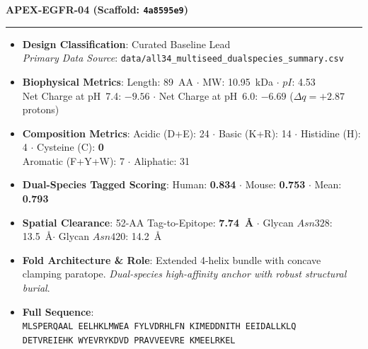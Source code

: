 \documentclass[11pt]{article}
\begin{document}
\noindent\textbf{\color{navyblue}\large APEX-EGFR-04  \quad (Scaffold: \texttt{4a8595e9})} \\
\vspace{-0.4em}
\rule{\textwidth}{0.6pt}
\vspace{-0.2em}
\begin{itemize}
  \setlength{\itemsep}{2pt}
  \setlength{\parskip}{0pt}
  \item \textbf{Design Classification}: Curated Baseline Lead \\
    \textit{Primary Data Source}: \texttt{\small data/all34\_multiseed\_dualspecies\_summary.csv}
  \item \textbf{Biophysical Metrics}: Length: 89~AA $\cdot$ MW: 10.95~kDa $\cdot$ $pI$: 4.53 \\
    Net Charge at pH~7.4: $-9.56$ $\cdot$ Net Charge at pH~6.0: $-6.69$ ($\Delta q = +2.87$ protons)
  \item \textbf{Composition Metrics}: Acidic (D+E): 24 $\cdot$ Basic (K+R): 14 $\cdot$ Histidine (H): 4 $\cdot$ Cysteine (C): \textbf{0} \\
    Aromatic (F+Y+W): 7 $\cdot$ Aliphatic: 31
  \item \textbf{Dual-Species Tagged Scoring}: Human: \textbf{0.834} $\cdot$ Mouse: \textbf{0.753} $\cdot$ Mean: \textbf{0.793}
  \item \textbf{Spatial Clearance}: 52-AA Tag-to-Epitope: \textbf{7.74~\AA} $\cdot$ Glycan $Asn328$: 13.5~\AA $\cdot$ Glycan $Asn420$: 14.2~\AA
  \item \textbf{Fold Architecture \& Role}: Extended 4-helix bundle with concave clamping paratope. \textit{Dual-species high-affinity anchor with robust structural burial}.
  \item \textbf{Full Sequence}: \\
    \texttt{\small MLSPERQAAL EELHKLMWEA FYLVDRHLFN KIMEDDNITH EEIDALLKLQ \\
    DETVREIEHK WYEVRYKDVD PRAVVEEVRE KMEELRKEL}
\end{itemize}
\vspace{0.8em}
\end{document}
